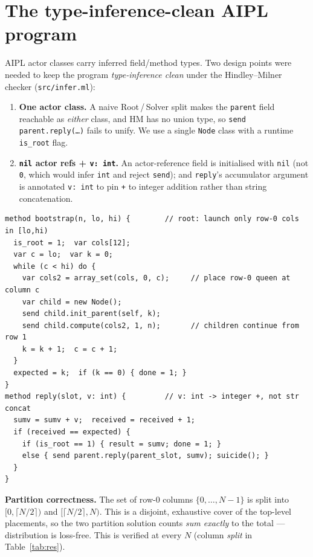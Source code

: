 \documentclass[11pt]{article}
\begin{document}
\section{The type-inference-clean AIPL program}
AIPL actor classes carry inferred field/method types. Two design points were
needed to keep the program \emph{type-inference clean} under the
Hindley--Milner checker (\texttt{src/infer.ml}):
\begin{enumerate}
  \item \textbf{One actor class.} A naive Root\,/\,Solver split makes the
  \texttt{parent} field reachable as \emph{either} class, and HM has no union
  type, so \texttt{send parent.reply(\dots)} fails to unify. We use a single
  \texttt{Node} class with a runtime \texttt{is\_root} flag.
  \item \textbf{\texttt{nil} actor refs + \texttt{v:\,int}.} An actor-reference
  field is initialised with \texttt{nil} (not \texttt{0}, which would infer
  \texttt{int} and reject \texttt{send}); and \texttt{reply}'s accumulator
  argument is annotated \texttt{v: int} to pin \texttt{+} to integer addition
  rather than string concatenation.
\end{enumerate}

\begin{lstlisting}[caption={Core of \texttt{dist\_nqueens\_xinu.abcl} (row-0 partition).}]
method bootstrap(n, lo, hi) {        // root: launch only row-0 cols in [lo,hi)
  is_root = 1;  var cols[12];
  var c = lo;  var k = 0;
  while (c < hi) do {
    var cols2 = array_set(cols, 0, c);     // place row-0 queen at column c
    var child = new Node();
    send child.init_parent(self, k);
    send child.compute(cols2, 1, n);       // children continue from row 1
    k = k + 1;  c = c + 1;
  }
  expected = k;  if (k == 0) { done = 1; }
}
method reply(slot, v: int) {         // v: int -> integer +, not str concat
  sumv = sumv + v;  received = received + 1;
  if (received == expected) {
    if (is_root == 1) { result = sumv; done = 1; }
    else { send parent.reply(parent_slot, sumv); suicide(); }
  }
}
\end{lstlisting}

\noindent\textbf{Partition correctness.} The set of row-0 columns
$\{0,\dots,N-1\}$ is split into $[0,\lceil N/2\rceil)$ and $[\lceil N/2\rceil,N)$.
This is a disjoint, exhaustive cover of the top-level placements, so the two
partition solution counts \emph{sum exactly} to the total --- distribution is
loss-free. This is verified at every $N$ (column \textit{split} in
Table~\ref{tab:res}).
\end{document}
